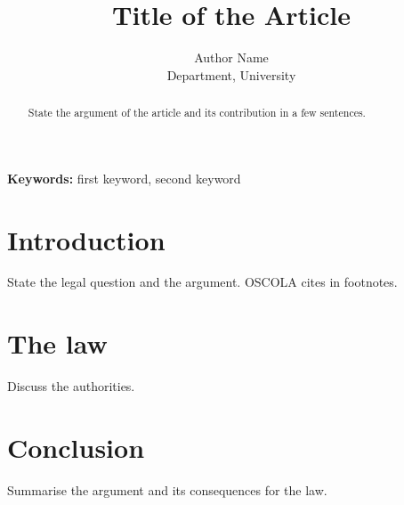 \documentclass[12pt,a4paper]{article}
\title{Title of the Article}
\author{Author Name\\ \small Department, University}
\date{}
\begin{document}
\maketitle

\begin{abstract}
State the argument of the article and its contribution in a few sentences.
\end{abstract}

\noindent\textbf{Keywords:} first keyword, second keyword

\section{Introduction}
State the legal question and the argument. OSCOLA cites in footnotes.\autocite{hart1961}

\section{The law}
Discuss the authorities.\autocite[22]{dworkin1977}

\section{Conclusion}
Summarise the argument and its consequences for the law.

\printbibliography
\end{document}
